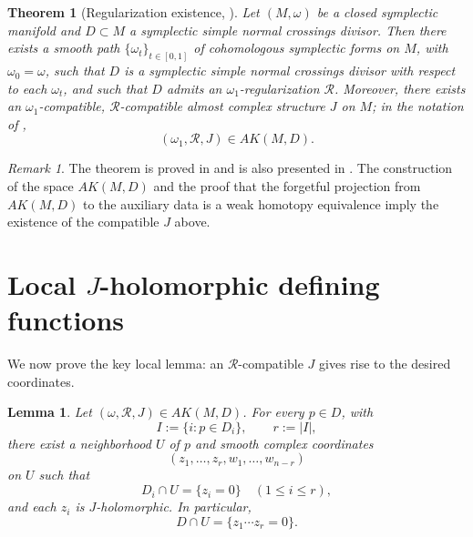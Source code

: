 \documentclass[11pt]{article}
\newtheorem{theorem}{Theorem}
\newtheorem{lemma}{Lemma}
\theoremstyle{remark}
\newtheorem{remark}{Remark}
\begin{document}
\begin{theorem}[Regularization existence, {\cite[Theorem 7]{TMZ18}}]\label{thm:reg}
Let $(M,\omega)$ be a closed symplectic manifold and $D\subset M$ a symplectic simple normal crossings divisor. Then there exists a smooth path $\{\omega_t\}_{t\in[0,1]}$ of cohomologous symplectic forms on $M$, with $\omega_0=\omega$, such that $D$ is a symplectic simple normal crossings divisor with respect to each $\omega_t$, and such that $D$ admits an $\omega_1$-regularization $\mathcal R$. Moreover, there exists an $\omega_1$-compatible, $\mathcal R$-compatible almost complex structure $J$ on $M$; in the notation of \cite{TMZ18},
\[
(\omega_1,\mathcal R,J)\in AK(M,D).
\]
\end{theorem}

\begin{remark}
The theorem is proved in \cite{TMZ18} and is also presented in \cite{NSF}. The construction of the space $AK(M,D)$ and the proof that the forgetful projection from $AK(M,D)$ to the auxiliary data is a weak homotopy equivalence imply the existence of the compatible $J$ above.
\end{remark}

\section{Local $J$-holomorphic defining functions}

We now prove the key local lemma: an $\mathcal R$-compatible $J$ gives rise to the desired coordinates.

\begin{lemma}\label{lem:local}
Let $(\omega,\mathcal R,J)\in AK(M,D)$. For every $p\in D$, with
\[
I:=\{i:p\in D_i\},\qquad r:=|I|,
\]
there exist a neighborhood $U$ of $p$ and smooth complex coordinates
\[
(z_1,\dots,z_r,w_1,\dots,w_{n-r})
\]
on $U$ such that
\[
D_i\cap U=\{z_i=0\}\quad (1\le i\le r),
\]
and each $z_i$ is $J$-holomorphic. In particular,
\[
D\cap U=\{z_1\cdots z_r=0\}.
\]
\end{lemma}
\end{document}
